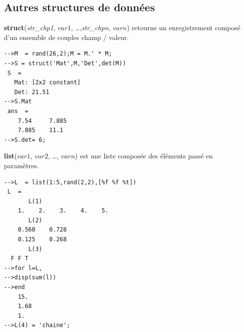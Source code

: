 \documentclass{article}
\begin{document}
\begin{multicols}{3}
\subsection{Autres structures de données}
\begin{description}
\item {\textbf{struct}(\textit{str\_chp1}, $var1$, \ldots,\textit{str\_chpn}, $varn$)} retourne un enregistrement composé d'un ensemble de couples champ / valeur.\\
\begin{verbatim}
-->M  = rand(26,2);M = M.' * M;
-->S = struct('Mat',M,'Det',det(M))
 S  =
   Mat: [2x2 constant]
   Det: 21.51
-->S.Mat
 ans  =
    7.54     7.885  
    7.885    11.1
-->S.det= 6;
\end{verbatim}
\item{\textbf{list}($var1$, $var2$, \ldots, $varn$)} est une liste composée des éléments passé en paramètres.
\begin{verbatim}
-->L  = list(1:5,rand(2,2),[%f %f %t])
 L  =
       L(1)
    1.    2.    3.    4.    5.  
       L(2)
    0.560    0.728  
    0.125    0.268  
       L(3)
  F F T  
-->for l=L,
-->disp(sum(l))
-->end
    15.  
    1.68  
    1.  
-->L(4) = 'chaine';
\end{verbatim}
\end{description}

\end{multicols}
\end{document}
